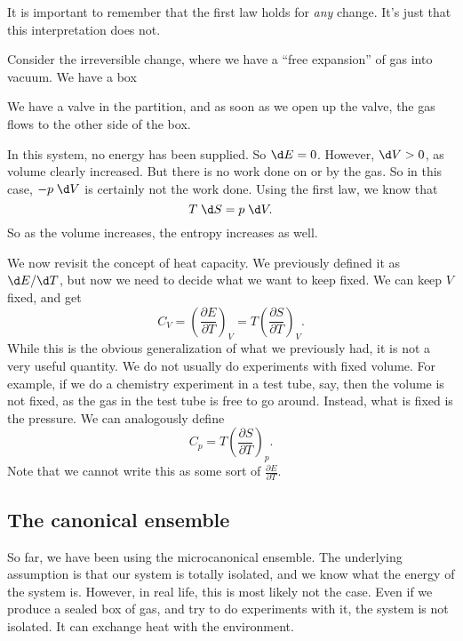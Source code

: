 \documentclass[a4paper]{article}
\begin{document}
It is important to remember that the first law holds for \emph{any} change. It's just that this interpretation does not.
\begin{eg}
  Consider the irreversible change, where we have a ``free expansion'' of gas into vacuum. We have a box
  \begin{center}
  \end{center}
  We have a valve in the partition, and as soon as we open up the valve, the gas flows to the other side of the box.

  In this system, no energy has been supplied. So $\d E = 0$. However, $\d V > 0$, as volume clearly increased. But there is no work done on or by the gas. So in this case, $-p \;\d V$ is certainly not the work done. Using the first law, we know that
  \[
    T \;\d S = p \;\d V.
  \]
  So as the volume increases, the entropy increases as well.
\end{eg}

We now revisit the concept of heat capacity. We previously defined it as $\d E/\d T$, but now we need to decide what we want to keep fixed. We can keep $V$ fixed, and get
\[
  C_V = \left(\frac{\partial E}{\partial T}\right)_V = T \left(\frac{\partial S}{\partial T}\right)_V.
\]
While this is the obvious generalization of what we previously had, it is not a very useful quantity. We do not usually do experiments with fixed volume. For example, if we do a chemistry experiment in a test tube, say, then the volume is not fixed, as the gas in the test tube is free to go around. Instead, what is fixed is the pressure. We can analogously define
\[
  C_p = T \left(\frac{\partial S}{\partial T}\right)_p.
\]
Note that we cannot write this as some sort of $\frac{\partial E}{\partial T}$.

\subsection{The canonical ensemble}
So far, we have been using the microcanonical ensemble. The underlying assumption is that our system is totally isolated, and we know what the energy of the system is. However, in real life, this is most likely not the case. Even if we produce a sealed box of gas, and try to do experiments with it, the system is not isolated. It can exchange heat with the environment.
\end{document}
